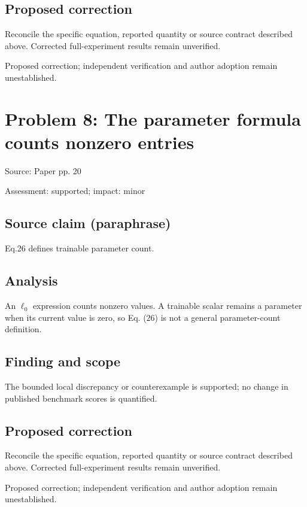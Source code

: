 \documentclass[11pt]{article}
\begin{document}
\subsection*{Proposed correction}

Reconcile the specific equation, reported quantity or source contract described above. Corrected full-experiment results remain unverified.

Proposed correction; independent verification and author adoption remain unestablished.

\section*{Problem 8: The parameter formula counts nonzero entries}

Source: Paper pp. 20

Assessment: supported; impact: minor

\subsection*{Source claim (paraphrase)}

Eq.26 defines trainable parameter count.

\subsection*{Analysis}

An \(\ell_0\) expression counts nonzero values. A trainable scalar remains a parameter when its current value is zero, so Eq. (\(26\)) is not a general parameter-count definition.

\subsection*{Finding and scope}

The bounded local discrepancy or counterexample is supported; no change in published benchmark scores is quantified.

\subsection*{Proposed correction}

Reconcile the specific equation, reported quantity or source contract described above. Corrected full-experiment results remain unverified.

Proposed correction; independent verification and author adoption remain unestablished.
\end{document}
